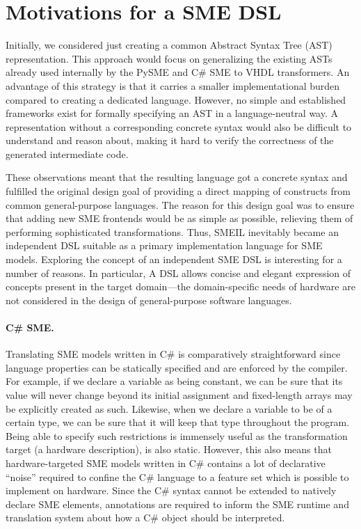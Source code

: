 \section{Motivations for a SME DSL}
\label{sec:smemot}

Initially, we considered just creating a common Abstract Syntax Tree (AST)
representation. This approach would focus on generalizing the existing ASTs
already used internally by the PySME and C\# SME to VHDL transformers. An
advantage of this strategy is that it carries a smaller implementational burden
compared to creating a dedicated language. However, no simple and established
frameworks exist for formally specifying an AST in a language-neutral way. A
representation without a corresponding concrete syntax would also be difficult
to understand and reason about, making it hard to verify the correctness of the
generated intermediate code.

These observations meant that the resulting language got a concrete syntax
and fulfilled the original design goal of providing a direct mapping of
constructs from common general-purpose languages. The reason for this design
goal was to ensure that adding new SME frontends would be as simple as possible,
relieving them of performing sophisticated transformations. Thus, SMEIL
inevitably became an independent DSL suitable as a primary implementation
language for SME models. Exploring the concept of an independent SME DSL is
interesting for a number of reasons. In particular, A DSL allows concise and
elegant expression of concepts present in the target domain---the
domain-specific needs of hardware are not considered in the design of
general-purpose software languages.

\paragraph{C\# SME.}
Translating SME models written in C\# is comparatively straightforward since
language properties can be statically specified and are enforced by the
compiler. For example, if we declare a variable as being constant, we can be
sure that its value will never change beyond its initial assignment and
fixed-length arrays may be explicitly created as such. Likewise, when we declare
a variable to be of a certain type, we can be sure that it will keep that type
throughout the program. Being able to specify such restrictions is immensely
useful as the transformation target (a hardware description), is also
static. However, this also means that hardware-targeted SME models written in
C\# contains a lot of declarative ``noise'' required to confine the C\# language
to a feature set which is possible to implement on hardware. Since the C\#
syntax cannot be extended to natively declare SME elements, annotations are
required to inform the SME runtime and translation system about how a C\# object
should be interpreted.


